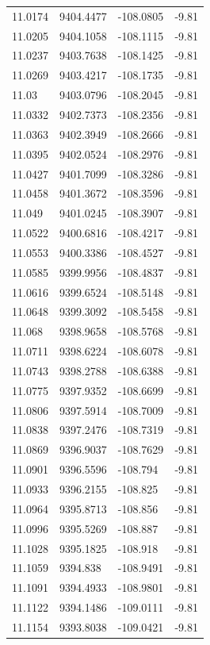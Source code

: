 \begin{table}[H]
\begin{tabular}{llll}
11.0174 & 9404.4477 & -108.0805 & -9.81 \\
11.0205 & 9404.1058 & -108.1115 & -9.81 \\
11.0237 & 9403.7638 & -108.1425 & -9.81 \\
11.0269 & 9403.4217 & -108.1735 & -9.81 \\
11.03 & 9403.0796 & -108.2045 & -9.81 \\
11.0332 & 9402.7373 & -108.2356 & -9.81 \\
11.0363 & 9402.3949 & -108.2666 & -9.81 \\
11.0395 & 9402.0524 & -108.2976 & -9.81 \\
11.0427 & 9401.7099 & -108.3286 & -9.81 \\
11.0458 & 9401.3672 & -108.3596 & -9.81 \\
11.049 & 9401.0245 & -108.3907 & -9.81 \\
11.0522 & 9400.6816 & -108.4217 & -9.81 \\
11.0553 & 9400.3386 & -108.4527 & -9.81 \\
11.0585 & 9399.9956 & -108.4837 & -9.81 \\
11.0616 & 9399.6524 & -108.5148 & -9.81 \\
11.0648 & 9399.3092 & -108.5458 & -9.81 \\
11.068 & 9398.9658 & -108.5768 & -9.81 \\
11.0711 & 9398.6224 & -108.6078 & -9.81 \\
11.0743 & 9398.2788 & -108.6388 & -9.81 \\
11.0775 & 9397.9352 & -108.6699 & -9.81 \\
11.0806 & 9397.5914 & -108.7009 & -9.81 \\
11.0838 & 9397.2476 & -108.7319 & -9.81 \\
11.0869 & 9396.9037 & -108.7629 & -9.81 \\
11.0901 & 9396.5596 & -108.794 & -9.81 \\
11.0933 & 9396.2155 & -108.825 & -9.81 \\
11.0964 & 9395.8713 & -108.856 & -9.81 \\
11.0996 & 9395.5269 & -108.887 & -9.81 \\
11.1028 & 9395.1825 & -108.918 & -9.81 \\
11.1059 & 9394.838 & -108.9491 & -9.81 \\
11.1091 & 9394.4933 & -108.9801 & -9.81 \\
11.1122 & 9394.1486 & -109.0111 & -9.81 \\
11.1154 & 9393.8038 & -109.0421 & -9.81 \\

\end{tabular}
\end{table}

